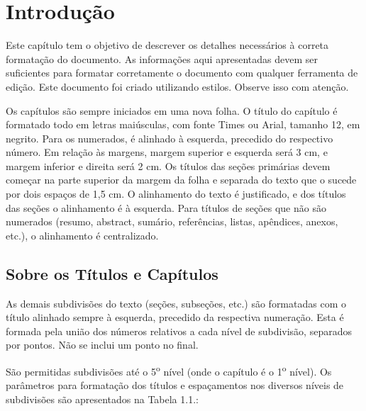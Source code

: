 \documentclass[
	oneside,
	english,brazil,				%
	mestrado,ppgc
	]
	{infufrgs}
\begin{document}
\listoftables
\cleardoublepage

\printglossary[type=\acronymtype,title={Lista de Abreviaturas e Siglas}]
\cleardoublepage

\tableofcontents*
\cleardoublepage

\textual

\chapter{Introdução}

Este capítulo tem o objetivo de descrever os detalhes necessários à correta formatação do documento. As informações aqui apresentadas devem ser suficientes para formatar corretamente o documento com qualquer ferramenta de edição. Este documento foi criado utilizando estilos. Observe isso com atenção. 

Os capítulos são sempre iniciados em uma nova folha. O título do capítulo é formatado todo em letras maiúsculas, com fonte Times ou Arial, tamanho 12, em negrito. Para os numerados, é alinhado à esquerda, precedido do respectivo número. Em relação às margens, margem superior e esquerda será 3 cm, e margem inferior e direita será 2 cm. Os títulos das seções primárias devem começar na parte superior da margem da folha e separada do texto que o sucede por dois espaços de 1,5 cm. O alinhamento do texto é justificado, e dos títulos das seções o alinhamento é à esquerda. Para títulos de seções que não são numerados (resumo, abstract, sumário, referências, listas, apêndices, anexos, etc.), o alinhamento é centralizado.

\section{Sobre os Títulos e Capítulos}

As demais subdivisões do texto (seções, subseções, etc.) são formatadas com o título
alinhado sempre à esquerda, precedido da respectiva numeração. Esta é formada pela união
dos números relativos a cada nível de subdivisão, separados por pontos. Não se inclui um
ponto no final.

São permitidas subdivisões até o 5\textsuperscript{o} nível (onde o capítulo é o 1\textsuperscript{o} nível). Os parâmetros
para formatação dos títulos e espaçamentos nos diversos níveis de subdivisões são
apresentados na Tabela 1.1.:
\end{document}
